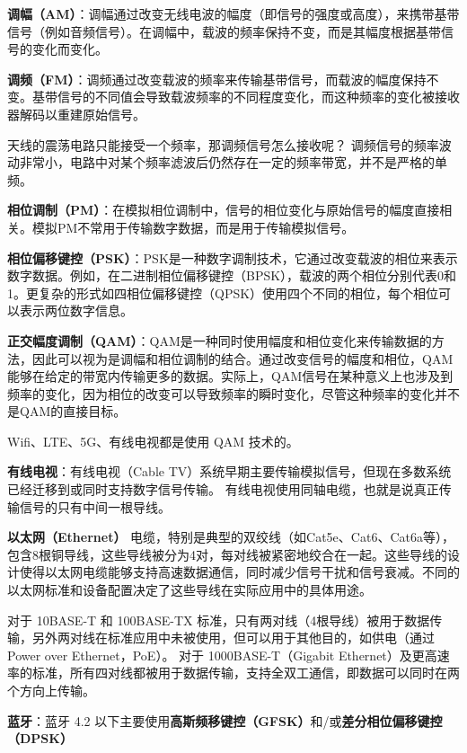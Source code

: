 
\textbf{调幅（AM）}：调幅通过改变无线电波的幅度（即信号的强度或高度），来携带基带信号（例如音频信号）。在调幅中，载波的频率保持不变，而是其幅度根据基带信号的变化而变化。

\textbf{调频（FM）}：调频通过改变载波的频率来传输基带信号，而载波的幅度保持不变。基带信号的不同值会导致载波频率的不同程度变化，而这种频率的变化被接收器解码以重建原始信号。

天线的震荡电路只能接受一个频率，那调频信号怎么接收呢？ 调频信号的频率波动非常小，电路中对某个频率滤波后仍然存在一定的频率带宽，并不是严格的单频。

\textbf{相位调制（PM）}：在模拟相位调制中，信号的相位变化与原始信号的幅度直接相关。模拟PM不常用于传输数字数据，而是用于传输模拟信号。

\textbf{相位偏移键控（PSK）}：PSK是一种数字调制技术，它通过改变载波的相位来表示数字数据。例如，在二进制相位偏移键控（BPSK），载波的两个相位分别代表0和1。更复杂的形式如四相位偏移键控（QPSK）使用四个不同的相位，每个相位可以表示两位数字信息。

\textbf{正交幅度调制（QAM）}：QAM是一种同时使用幅度和相位变化来传输数据的方法，因此可以视为是调幅和相位调制的结合。通过改变信号的幅度和相位，QAM能够在给定的带宽内传输更多的数据。实际上，QAM信号在某种意义上也涉及到频率的变化，因为相位的改变可以导致频率的瞬时变化，尽管这种频率的变化并不是QAM的直接目标。

Wifi、LTE、5G、有线电视都是使用 QAM 技术的。

\textbf{有线电视}：有线电视（Cable TV）系统早期主要传输模拟信号，但现在多数系统已经迁移到或同时支持数字信号传输。 有线电视使用同轴电缆，也就是说真正传输信号的只有中间一根导线。

\textbf{以太网（Ethernet）} 电缆，特别是典型的双绞线（如Cat5e、Cat6、Cat6a等），包含8根铜导线，这些导线被分为4对，每对线被紧密地绞合在一起。这些导线的设计使得以太网电缆能够支持高速数据通信，同时减少信号干扰和信号衰减。不同的以太网标准和设备配置决定了这些导线在实际应用中的具体用途。

对于 10BASE-T 和 100BASE-TX 标准，只有两对线（4根导线）被用于数据传输，另外两对线在标准应用中未被使用，但可以用于其他目的，如供电（通过 Power over Ethernet，PoE）。
对于 1000BASE-T（Gigabit Ethernet）及更高速率的标准，所有四对线都被用于数据传输，支持全双工通信，即数据可以同时在两个方向上传输。

\textbf{蓝牙}：蓝牙 4.2 以下主要使用\textbf{高斯频移键控（GFSK）}和/或\textbf{差分相位偏移键控（DPSK）}

